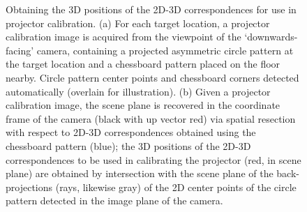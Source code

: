 \documentclass[review]{elsarticle}
\begin{document}
\begin{figure}[ht]
    \centering
    \qquad
    \caption{Obtaining the 3D positions of the 2D-3D correspondences for use in projector calibration. (a) For each target location, a projector calibration image is acquired from the viewpoint of the `downwards-facing' camera, containing a projected asymmetric circle pattern at the target location and a chessboard pattern placed on the floor nearby. Circle pattern center points and chessboard corners detected automatically (overlain for illustration). (b) Given a projector calibration image, the scene plane is recovered in the coordinate frame of the camera (black with up vector red) via spatial resection with respect to 2D-3D correspondences obtained using the chessboard pattern (blue); the 3D positions of the 2D-3D correspondences to be used in calibrating the projector (red, in scene plane) are obtained by intersection with the scene plane of the back-projections (rays, likewise gray) of the 2D center points of the circle pattern detected in the image plane of the camera.} %
    \label{fig:2d}
\end{figure}
\end{document}
